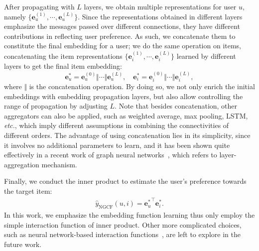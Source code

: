 \documentclass[sigconf]{acmart}
\newcommand{\Trans}[1]{{#1}^{\top}}
\newcommand{\Mat}[1]{\mathbf{#1}}
\newcommand{\etc}{\emph{etc.}}
\theoremstyle{definition}
\begin{document}
After propagating with $L$ layers, we obtain multiple representations for user $u$, namely $\{\Mat{e}^{(1)}_{u},\cdots,\Mat{e}^{(L)}_{u}\}$.
Since the representations obtained in different layers emphasize the messages passed over different connections, they have different contributions in reflecting user preference.
As such, we concatenate them to constitute the final embedding for a user; we do the same operation on items, concatenating the item representations $\{\Mat{e}^{(1)}_{i},\cdots,\Mat{e}^{(L)}_{i}\}$ learned by different layers to get the final item embedding:
\begin{equation}\label{equ:final-rep}
\Mat{e}^{*}_{u}= \Mat{e}^{(0)}_{u}\Vert\cdots\Vert\Mat{e}^{(L)}_{u}, \quad
\Mat{e}^{*}_{i}=\Mat{e}^{(0)}_{i}\Vert\cdots\Vert\Mat{e}^{(L)}_{i},
\end{equation}
where $\Vert$ is the concatenation operation.
By doing so, we not only enrich the initial embeddings with embedding propagation layers, but also allow controlling the range of propagation by adjusting $L$. Note that besides concatenation, other aggregators can also be applied, such as weighted average, max pooling, LSTM, \etc, which imply different assumptions in combining the connectivities of different orders. The advantage of using concatenation lies in its simplicity, since it involves no additional parameters to learn, and it has been shown quite effectively in a recent work of graph neural networks~\cite{JumpKG}, which refers to layer-aggregation mechanism. 

Finally, we conduct the inner product to estimate the user's preference towards the target item:
\begin{align}
\hat{y}_{\text{NGCF}}(u,i)=\Trans{\Mat{e}^{*}_{u}}\Mat{e}^{*}_{i}.
\end{align}
In this work, we emphasize the embedding function learning thus only employ the simple interaction function of inner product. Other more complicated choices, such as neural network-based interaction functions~\cite{NCF}, are left to explore in the future work. 
\end{document}
